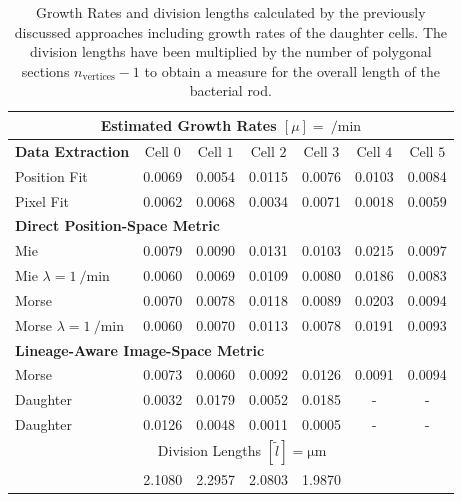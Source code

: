 \begin{table}[H]
    \centering
    \begin{tabular}{l c c c c c c}
        \multicolumn{7}{c}{Estimated Growth Rates $[\mu]=\SI{}{\per\minute}$}\\
        \toprule
        \textbf{Data Extraction} & Cell $0$ & Cell $1$ & Cell $2$ & Cell $3$ & Cell
        $4$ & Cell $5$\\
        \midrule
        Position Fit & 0.0069 & 0.0054 & 0.0115 & 0.0076 & 0.0103 & 0.0084\\
        Pixel Fit    & 0.0062 & 0.0068 & 0.0034 & 0.0071 & 0.0018 & 0.0059\\

        \multicolumn{7}{l}{\textbf{Direct Position-Space Metric}}\\
        \midrule
        Mie                                 & 0.0079 & 0.0090 & 0.0131 & 0.0103 &
        0.0215 & 0.0097\\
        Mie $\lambda=\SI{1}{\per\minute}$   & 0.0060 & 0.0069 & 0.0109 & 0.0080 &
        0.0186 & 0.0083\\
        Morse                               & 0.0070 & 0.0078 & 0.0118 & 0.0089 &
        0.0203 & 0.0094\\
        Morse $\lambda=\SI{1}{\per\minute}$ & 0.0060 & 0.0070 & 0.0113 & 0.0078 &
        0.0191 & 0.0093\\

        \multicolumn{7}{l}{\textbf{Lineage-Aware Image-Space Metric}}\\
        \midrule
        Morse                               & 0.0073 & 0.0060 & 0.0092 & 0.0126 &
        0.0091 & 0.0094\\
        Daughter                            & 0.0032 & 0.0179 & 0.0052 & 0.0185 & - & -\\
        Daughter                            & 0.0126 & 0.0048 & 0.0011 & 0.0005 & - & -\\
        \midrule
        & \multicolumn{4}{c}{Division Lengths $[\tilde{l}]=\unit{\micro\metre}$}\\
        & 2.1080 & 2.2957 & 2.0803 & 1.9870\\
        \bottomrule
    \end{tabular}
    \caption{
        Growth Rates and division lengths calculated by the previously discussed approaches
        including growth rates of the daughter cells.
        The division lengths have been multiplied by the number of polygonal sections
        $n_\text{vertices}-1$ to obtain a measure for the overall length of the bacterial rod.
    }
    \label{tab:comparison-growth-rates}
\end{table}


